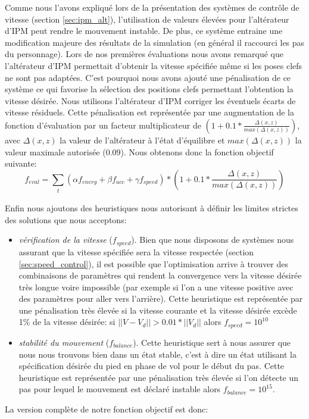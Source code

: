 \documentclass[runningheads,a4paper]{llncs}
\begin{document}
Comme nous l'avons expliqué lors de la présentation des systèmes de contrôle de vitesse (section \ref{sec:ipm_alt}), l'utilisation de valeurs élevées pour l'altérateur d'IPM peut rendre le mouvement instable. De plus, ce système entraine une modification majeure des résultats de la simulation (en général il raccourci les pas du personnage). Lors de nos premières évaluations nous avons remarqué que l'altérateur d'IPM permettait d'obtenir la vitesse spécifiée même si les poses clefs ne sont pas adaptées. C'est pourquoi nous avons ajouté une pénalisation de ce système ce qui favorise la sélection des positions clefs permettant l'obtention la vitesse désirée. Nous utilisons l'altérateur d'IPM corriger les éventuels écarts de vitesse résiduels. Cette pénalisation est représentée par une augmentation de la fonction d'évaluation par un facteur multiplicateur de $(1+0.1*\frac{\Delta(x,z)}{max(\Delta(x,z))})$, avec $\Delta(x,z)$ la valeur de l'altérateur à l'état d'équilibre et $max(\Delta(x,z))$ la valeur maximale autorisée (0.09). Nous obtenons donc la fonction objectif suivante:
$$
f_{eval} = \sum_{\substack{t}} (\alpha f_{energ} + \beta f_{acc} + \gamma f_{speed})*(1+0.1*\frac{\Delta(x,z)}{max(\Delta(x,z))}) 
$$

Enfin nous ajoutons des heuristiques nous autorisant à définir les limites strictes des solutions que nous acceptons:
\begin{itemize}
\item{\textit{vérification de la vitesse} ($f_{speed}$). Bien que nous disposons de systèmes nous assurant que la vitesse spécifiée sera la vitesse respectée (section \ref{sec:speed_control}), il est possible que l'optimisation arrive à trouver des combinaisons de paramètres qui rendent la convergence vers la vitesse désirée très longue voire impossible (par exemple si l'on a une vitesse positive avec des paramètres pour aller vers l'arrière). Cette heuristique est représentée par une pénalisation très élevée si la vitesse courante et la vitesse désirée excède 1\% de la vitesse désirée: si $||V-V_d||>0.01*||V_d||$ alors $f_{speed}=10^{10}$}
\item{\textit{stabilité du mouvement} ($f_{balance}$).  Cette heuristique sert à nous assurer que nous nous trouvons bien dans un état stable, c'est à dire un état utilisant la spécification désirée du pied en phase de vol pour le début du pas. Cette heuristique est représentée par une pénalisation très élevée si l'on détecte un pas pour lequel le mouvement est déclaré instable alors $f_{balance}=10^{15}$.  }
\end{itemize}
 La version complète de notre fonction objectif est donc:
\end{document}
